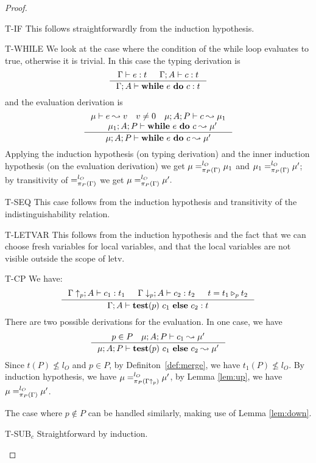 {{{\begin{proof}
\begin{ProofEnumDesc}
\item[T-IF]
This follows straightforwardly from the induction hypothesis.

\item[T-WHILE]
We look at the case where the condition of the while loop
evaluates to true, otherwise it is trivial.
In this case the typing derivation is
$$
\inference
{\Gamma \vdash e : t & \Gamma ; A\vdash c : t  }
{\Gamma; A \vdash \lcWHILE{e}{c} : t }
$$
and the evaluation derivation is
$$
\inference{
\mu \vdash e \leadsto v\quad v\neq 0\quad
\mu;A; P \vdash c \leadsto \mu_1\\
\quad \mu_1 ; A ; P \vdash \lcWHILE{e}{c} \leadsto \mu'
}
{\mu;A; P \vdash \lcWHILE{e}{c} \leadsto \mu'}
$$
Applying the induction hypothesis (on typing derivation)
and the inner induction hypothesis (on the evaluation derivation)
we get $\mu =^{l_O}_{\app{\Gamma}{P}} \mu_1$ and $\mu_1 =^{l_O}_{\app{\Gamma}{P}} \mu'$; by transitivity of $=^{l_O}_{\app{\Gamma}{P}}$ we get $\mu =^{l_O}_{\app{\Gamma}{P}} \mu'.$

\item[T-SEQ] This case follows from the induction hypothesis
and transitivity of the indistinguishability relation.

\item[T-LETVAR] This follows from the induction hypothesis
and the fact that we can choose fresh variables for local
variables, and that the local variables are not visible
outside the scope of letv.

\item[T-CP]
We have:
$$
\inference
{\Gamma\uparrow_{p} ; A \vdash c_1 : t_1 &
\Gamma\downarrow_{p} ; A\vdash c_2 : t_2 &
t = \omerge{p}{t_1}{t_2}}
{\Gamma; A\vdash \lcCP{p}{c_1}{c_2} : t}
$$
There are two possible derivations for the evaluation.
In one case, we have
$$
\inference{p\in P \quad \mu; A; P \vdash c_1 \leadsto \mu'}
{\mu; A ; P \vdash \lcCP{p}{c_1}{c_2} \leadsto \mu'}
$$
Since $t(P) \nleq l_{O}$ and $p \in P$, by Definiton~\ref{def:merge},
we have $t_1(P) \nleq l_{O}$.
By induction hypothesis, we have $\mu =_{\app{\Gamma\uparrow_{p}}{P}}^{l_{O}} \mu'$,
by Lemma \ref{lem:up}, we have $\mu =_{\app{\Gamma}{P}}^{l_{O}} \mu'$.

The case where $p \notin P$ can be handled similarly,
making use of Lemma \ref{lem:down}.

\item[T-SUB$_c$] Straightforward by induction.
\end{ProofEnumDesc}
\end{proof}

}}}
